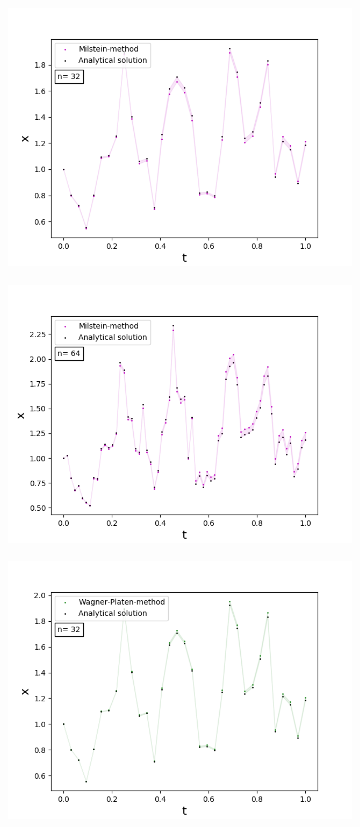 \begin{figure}[!h]
\begin{subfigure}{0.49\linewidth}
     \includegraphics[scale=0.4]{Content/Graphics/Appendix/2gbm3}
   \end{subfigure}
   \begin{subfigure}{0.49\linewidth} \centering
     \includegraphics[scale=0.4]{Content/Graphics/Appendix/5gbm3}
   \end{subfigure}
   \begin{subfigure}{0.49\linewidth} \centering
     \includegraphics[scale=0.4]{Content/Graphics/Appendix/3gbm3}

\end{subfigure}
\end{figure}
